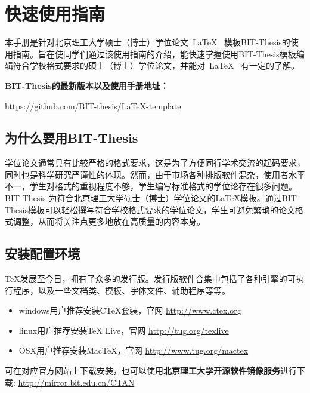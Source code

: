 
\chapter{快速使用指南}
\label{chap:what}

本手册是针对北京理工大学硕士（博士）学位论文~\LaTeX~ 模板BIT-Thesis的使用指南。旨在使同学们通过该使用指南的介绍，能快速掌握使用BIT-Thesis模板编辑符合学校格式要求的硕士（博士）学位论文，并能对~\LaTeX~ 有一定的了解。

\textbf{BIT-Thesis的最新版本以及使用手册地址：}
\begin{center}
\url{https://github.com/BIT-thesis/LaTeX-template}
\end{center}

\section{为什么要用BIT-Thesis}
\label{sec:why}
学位论文通常具有比较严格的格式要求，这是为了方便同行学术交流的起码要求，同时也是科学研究严谨性的体现。然而，由于市场各种排版软件混杂，使用者水平不一，学生对格式的重视程度不够，学生编写标准格式的学位论存在很多问题。BIT-Thesis 为符合北京理工大学硕士（博士）学位论文的LaTeX模板。通过BIT-Thesis模板可以轻松撰写符合学校格式要求的学位论文，学生可避免繁琐的论文格式调整，从而将关注点更多地放在高质量的内容本身。

\section{安装配置环境}
\label{sec:requirements}

\TeX 发展至今日，拥有了众多的发行版。发行版软件合集中包括了各种引擎的可执行程序，以及一些文档类、模板、字体文件、辅助程序等等。
\begin{itemize}
\item windows用户推荐安装CTeX套装，官网 \url{http://www.ctex.org}
\item linux用户推荐安装TeX Live，官网 \url{http://tug.org/texlive}
\item OSX用户推荐安装MacTeX，官网 \url{http://www.tug.org/mactex}
\end{itemize}

可在对应官方网站上下载安装，也可以使用\textbf{北京理工大学开源软件镜像服务}进行下载: \url{http://mirror.bit.edu.cn/CTAN}




